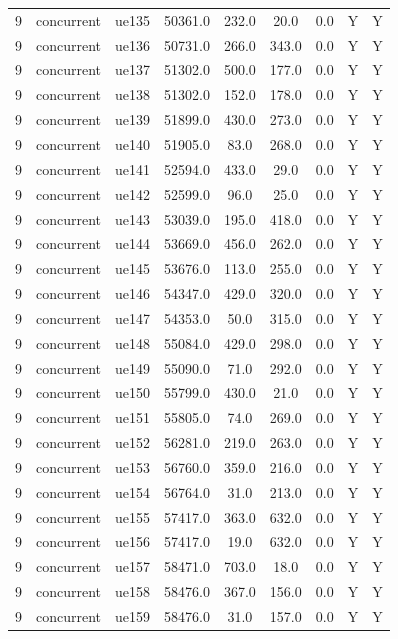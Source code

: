 \begin{table}[ht]
\begin{tabular}{|c|c|c|c|c|c|c|c|c|}
9 & concurrent & ue135 & 50361.0 & 232.0 & 20.0 & 0.0 & Y & Y \\
9 & concurrent & ue136 & 50731.0 & 266.0 & 343.0 & 0.0 & Y & Y \\
9 & concurrent & ue137 & 51302.0 & 500.0 & 177.0 & 0.0 & Y & Y \\
9 & concurrent & ue138 & 51302.0 & 152.0 & 178.0 & 0.0 & Y & Y \\
9 & concurrent & ue139 & 51899.0 & 430.0 & 273.0 & 0.0 & Y & Y \\
9 & concurrent & ue140 & 51905.0 & 83.0 & 268.0 & 0.0 & Y & Y \\
9 & concurrent & ue141 & 52594.0 & 433.0 & 29.0 & 0.0 & Y & Y \\
9 & concurrent & ue142 & 52599.0 & 96.0 & 25.0 & 0.0 & Y & Y \\
9 & concurrent & ue143 & 53039.0 & 195.0 & 418.0 & 0.0 & Y & Y \\
9 & concurrent & ue144 & 53669.0 & 456.0 & 262.0 & 0.0 & Y & Y \\
9 & concurrent & ue145 & 53676.0 & 113.0 & 255.0 & 0.0 & Y & Y \\
9 & concurrent & ue146 & 54347.0 & 429.0 & 320.0 & 0.0 & Y & Y \\
9 & concurrent & ue147 & 54353.0 & 50.0 & 315.0 & 0.0 & Y & Y \\
9 & concurrent & ue148 & 55084.0 & 429.0 & 298.0 & 0.0 & Y & Y \\
9 & concurrent & ue149 & 55090.0 & 71.0 & 292.0 & 0.0 & Y & Y \\
9 & concurrent & ue150 & 55799.0 & 430.0 & 21.0 & 0.0 & Y & Y \\
9 & concurrent & ue151 & 55805.0 & 74.0 & 269.0 & 0.0 & Y & Y \\
9 & concurrent & ue152 & 56281.0 & 219.0 & 263.0 & 0.0 & Y & Y \\
9 & concurrent & ue153 & 56760.0 & 359.0 & 216.0 & 0.0 & Y & Y \\
9 & concurrent & ue154 & 56764.0 & 31.0 & 213.0 & 0.0 & Y & Y \\
9 & concurrent & ue155 & 57417.0 & 363.0 & 632.0 & 0.0 & Y & Y \\
9 & concurrent & ue156 & 57417.0 & 19.0 & 632.0 & 0.0 & Y & Y \\
9 & concurrent & ue157 & 58471.0 & 703.0 & 18.0 & 0.0 & Y & Y \\
9 & concurrent & ue158 & 58476.0 & 367.0 & 156.0 & 0.0 & Y & Y \\
9 & concurrent & ue159 & 58476.0 & 31.0 & 157.0 & 0.0 & Y & Y \\

\end{tabular}
\end{table}
